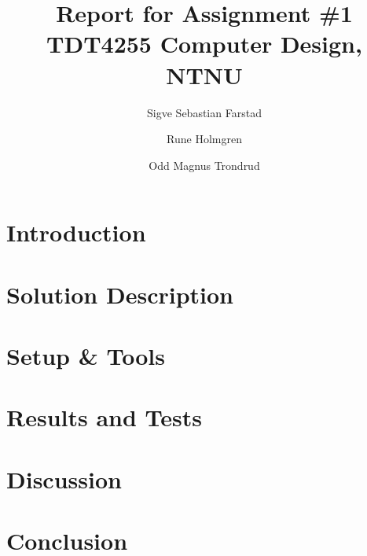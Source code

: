 \documentclass[10pt]{report}
\title{Report for Assignment \#1 \\
TDT4255 Computer Design, NTNU}
\author{Sigve Sebastian Farstad \and
		Rune Holmgren \and
		Odd Magnus Trondrud}
\begin{document}
\maketitle


\begin{abstract}
	
\end{abstract}

\tableofcontents

\listoffigures

\listoftables


\chapter{Introduction}


	

\chapter{Solution Description}
	

\chapter{Setup \& Tools}
	

\chapter{Results and Tests}
	

\chapter{Discussion}
	

\chapter{Conclusion}
	



{}

\nocite{*} %
\end{document}
